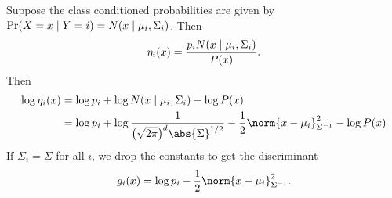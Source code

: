 Suppose the class conditioned probabilities are given by
$\Pr(X = x \mid Y = i) = N(x \mid \mu_i, \Sigma_i)$.
Then \[
    \eta_i(x) = \frac{p_i N(x \mid \mu_i, \Sigma_i)}{P(x)}.
\]
Then \begin{align*}
    \log \eta_i(x) &= \log p_i + \log N(x \given \mu_i, \Sigma_i) - \log P(x) \\
          &= \log p_i + \log \frac1{\big(\sqrt{2\pi}\big)^d \abs{\Sigma}^{1 / 2}}
          - \frac12 \norm{x - \mu_i}^2_{\Sigma^{-1}}
          - \log P(x)
\end{align*}
If $\Sigma_i = \Sigma$ for all $i$, we drop the constants to get the
discriminant \[
    g_i(x) = \log p_i - \frac12 \norm{x - \mu_i}^2_{\Sigma^{-1}}.
\]

